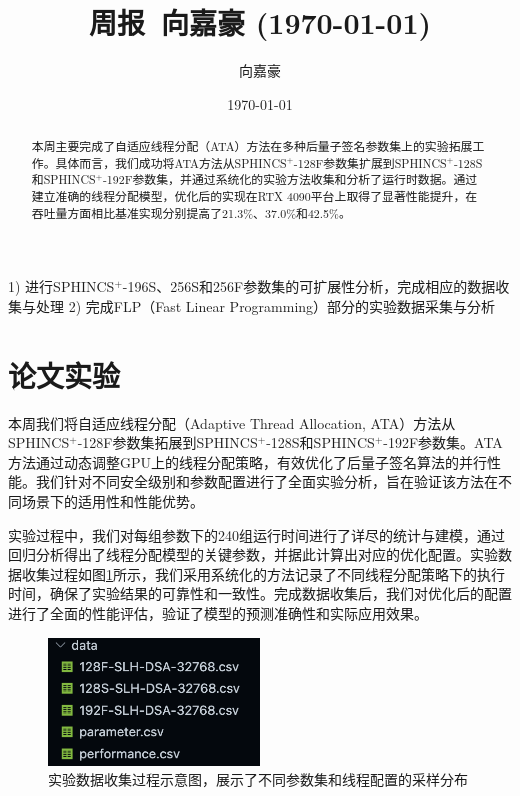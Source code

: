 \documentclass{article}
\title{周报~向嘉豪 (\today)}
\author{向嘉豪}
\date{\today}
\begin{document}
\maketitle

\begin{abstract}
  本周主要完成了自适应线程分配（ATA）方法在多种后量子签名参数集上的实验拓展工作。具体而言，我们成功将ATA方法从SPHINCS$^+$-128F参数集扩展到SPHINCS$^+$-128S和SPHINCS$^+$-192F参数集，并通过系统化的实验方法收集和分析了运行时数据。通过建立准确的线程分配模型，优化后的实现在RTX 4090平台上取得了显著性能提升，在吞吐量方面相比基准实现分别提高了21.3\%、37.0\%和42.5\%。
\end{abstract}

\begin{weekplan}
1) 进行SPHINCS$^+$-196S、256S和256F参数集的可扩展性分析，完成相应的数据收集与处理
2) 完成FLP（Fast Linear Programming）部分的实验数据采集与分析
\end{weekplan}

\section{论文实验}

本周我们将自适应线程分配（Adaptive Thread Allocation, ATA）方法从SPHINCS$^+$-128F参数集拓展到SPHINCS$^+$-128S和SPHINCS$^+$-192F参数集。ATA方法通过动态调整GPU上的线程分配策略，有效优化了后量子签名算法的并行性能。我们针对不同安全级别和参数配置进行了全面实验分析，旨在验证该方法在不同场景下的适用性和性能优势。

实验过程中，我们对每组参数下的240组运行时间进行了详尽的统计与建模，通过回归分析得出了线程分配模型的关键参数，并据此计算出对应的优化配置。实验数据收集过程如图\ref{fig:ata-128s}所示，我们采用系统化的方法记录了不同线程分配策略下的执行时间，确保了实验结果的可靠性和一致性。完成数据收集后，我们对优化后的配置进行了全面的性能评估，验证了模型的预测准确性和实际应用效果。

\begin{figure}[htbp]
\centering
\includegraphics[width=0.5\textwidth]{./fig/data-collection.png}
\caption{实验数据收集过程示意图，展示了不同参数集和线程配置的采样分布}
\label{fig:ata-128s}
\end{figure}
\end{document}
